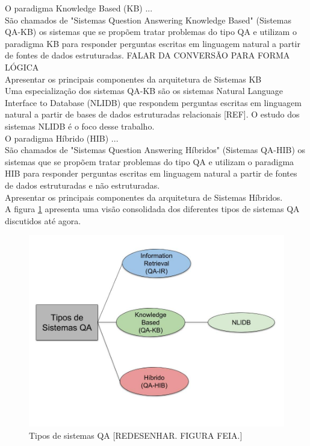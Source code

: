 \documentclass{article}
\begin{document}
O paradigma Knowledge Based (KB) ...\\

São chamados de "Sistemas Question Answering Knowledge Based" (Sistemas QA-KB) os sistemas que se propõem tratar problemas do tipo QA e utilizam o paradigma KB para responder perguntas escritas em linguagem natural a partir de fontes de dados estruturadas. FALAR DA CONVERSÃO PARA FORMA LÓGICA\\

Apresentar os principais componentes da arquitetura de Sistemas KB\\

Uma especialização dos sistemas QA-KB são os sistemas Natural Language Interface to Database (NLIDB) que respondem perguntas escritas em linguagem natural a partir de bases de dados estruturadas relacionais [REF]. O estudo dos sistemas NLIDB é o foco desse trabalho.\\

O paradigma Híbrido (HIB) ...\\

São chamados de "Sistemas Question Answering Híbridos" (Sistemas QA-HIB) os sistemas que se propõem tratar problemas do tipo QA e utilizam o paradigma HIB para responder perguntas escritas em linguagem natural a partir de fontes de dados estruturadas e não estruturadas.\\

Apresentar os principais componentes da arquitetura de Sistemas Híbridos.\\

A figura \ref{fig:TiposDeSistemasQA} apresenta uma visão consolidada dos diferentes tipos de sistemas QA discutidos até agora.\\

\begin{figure}[h!]
\centering
\includegraphics[scale=0.3]{TiposDeSistemasQA.jpg}
\caption{Tipos de sistemas QA [REDESENHAR. FIGURA FEIA.]}
\label{fig:TiposDeSistemasQA}
\end{figure}
\end{document}
